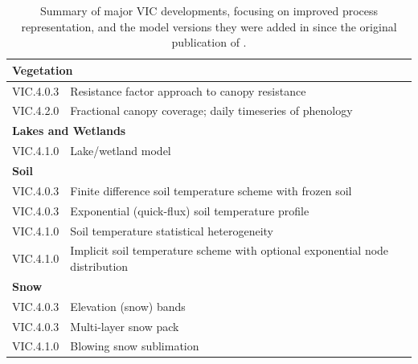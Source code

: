 \documentclass[gmd, manuscript]{copernicus}
\begin{document}
\clearpage
\begin{table}[]
  \centering
  \caption{Summary of major VIC developments, focusing on improved process representation, and the model versions they were added in since the original publication of \citep{Liang_1994}.}
  \label{table:vic_development}
  \begin{tabular}{|l|l|}
    \hline
    \multicolumn{2}{|l|}{\textbf{Vegetation}}                                                                     \\ \hline
    VIC.4.0.3 & Resistance factor approach to canopy resistance \citep{Wigmosta_1994}                             \\ \hline
    VIC.4.2.0 & Fractional canopy coverage; daily timeseries of phenology \citep{Bohn_2016}                       \\ \hline
    \multicolumn{2}{|l|}{\textbf{Lakes and Wetlands}}                                                             \\ \hline
    VIC.4.1.0 & Lake/wetland model \citep{Bowling_2010}                                                           \\ \hline
    \multicolumn{2}{|l|}{\textbf{Soil}}                                                                           \\ \hline
    VIC.4.0.3 & Finite difference soil temperature scheme with frozen soil\citep{Cherkauer_1999}                  \\ \hline
    VIC.4.0.3 & Exponential (quick-flux) soil temperature profile \citep{Liang_1999}                              \\ \hline
    VIC.4.1.0 & Soil temperature statistical heterogeneity \citep{Cherkauer_2003}                                 \\ \hline
    VIC.4.1.0 & Implicit soil temperature scheme with optional exponential node distribution \citep{Adam_2008}    \\ \hline
    \multicolumn{2}{|l|}{\textbf{Snow}}                                                                           \\ \hline
    VIC.4.0.3 & Elevation (snow) bands \citep{Nijssen_1997}                                                       \\ \hline
    VIC.4.0.3 & Multi-layer snow pack \citep{Andreadis_2009}                                                      \\ \hline
    VIC.4.1.0 & Blowing snow sublimation \citep{Bowling_2004}                                                     \\ \hline
  \end{tabular}
\end{table}
\end{document}
